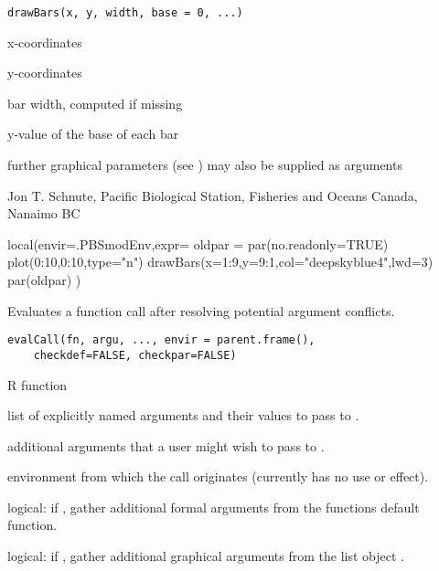 \documentclass[letterpaper]{book}
\begin{document}
%
\begin{Usage}
\begin{verbatim}
drawBars(x, y, width, base = 0, ...)
\end{verbatim}
\end{Usage}
%
\begin{Arguments}
\begin{ldescription}
\item[\code{x}] x-coordinates
\item[\code{y}] y-coordinates
\item[\code{width}] bar width, computed if missing
\item[\code{base}] y-value of the base of each bar
\item[\code{...}] further graphical parameters (see ) may also be supplied as arguments
\end{ldescription}
\end{Arguments}
%
\begin{Author}\relax
Jon T. Schnute, Pacific Biological Station, Fisheries and Oceans Canada, Nanaimo BC
\end{Author}
%
\begin{Examples}
\begin{ExampleCode}
local(envir=.PBSmodEnv,expr={
  oldpar = par(no.readonly=TRUE)
  plot(0:10,0:10,type="n")
  drawBars(x=1:9,y=9:1,col="deepskyblue4",lwd=3)
  par(oldpar)
})
\end{ExampleCode}
\end{Examples}
%
\begin{Description}\relax
Evaluates a function call after resolving potential
argument conflicts.
\end{Description}
%
\begin{Usage}
\begin{verbatim}
evalCall(fn, argu, ..., envir = parent.frame(),
    checkdef=FALSE, checkpar=FALSE)
\end{verbatim}
\end{Usage}
%
\begin{Arguments}
\begin{ldescription}
\item[\code{fn}]  R function 
\item[\code{argu}]  list of explicitly named arguments and their values to pass to . 
\item[\code{...}]  additional arguments that a user might wish to pass to . 
\item[\code{envir}]  environment from which the call originates (currently has no use or effect). 
\item[\code{checkdef}]  logical: if , gather additional formal arguments from the 
functions default function. 
\item[\code{checkpar}]  logical: if , gather additional graphical arguments from 
the list object . 
\end{ldescription}
\end{Arguments}
\end{document}
